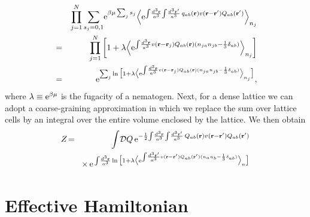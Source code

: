 \documentclass[jcp,aps,twocolumn,showpacs,supergroupedaddress,epsfig,amsmath,amssymb,eqsecnum]{revtex4}
\newcommand{\ba}{\begin{eqnarray}}
\newcommand{\ea}{\end{eqnarray}}
\newcommand{\rv}{{\bf r}}
\begin{document}
\ba
&&\prod_{j=1}^{N} 
\sum_{s_j=0,1} \! 
{\rm e}^{\beta \mu \sum_{j} s_j}
\Big\langle
{\rm e}^{\int \! \frac{d^3\rv}{a^3} \! 
\int \! \frac{d^3\rv'}{a^3} 
\, q_{ab}(\rv) v(\rv-\rv') Q_{ab}(\rv')}
\Big\rangle_{n_j}
\nonumber
\\
&=& 
\prod_{j=1}^{N} 
\left[ 
1 + \lambda \Big\langle 
{\rm e}^{\int \! \frac{d^3\rv}{a^3} v(\rv-\rv_j) Q_{ab}(\rv)(n_{ja}n_{jb}-\frac{1}{3}\delta_{ab})}
\Big\rangle_{n_j}
\right]
\nonumber\\
&=& 
{\rm e}^{\sum_j \ln 
\big[ 
1 + \lambda \big\langle 
{\rm e}^{\int \! \frac{d^3\rv}{a^3} v(\rv-\rv_j) Q_{ab}(\rv)(n_{ja}n_{jb}-\frac{1}{3}\delta_{ab})}
\big\rangle_{n_j}
\big]},
\nonumber
\ea
where $\lambda \equiv {\rm e}^{\beta\mu}$ is the fugacity of a nematogen. Next, for a dense lattice we can adopt a coarse-graining approximation in which we replace the sum over lattice cells by an integral over the entire volume enclosed by the lattice. We then obtain 
\ba
Z &\!=\!& \int\!\mathcal{D}Q \, 
{\rm e}^{-\frac{1}{2} \!\int\! \frac{d^3\rv}{a^3} \! \int \! \frac{d^3\rv'}{a^3} \, 
Q_{ab}(\rv) v(\rv - \rv') Q_{ab}(\rv')}
\\
&&\times \, 
{\rm e}^{\, \int \! \frac{d^3\rv}{a^3} \ln
\big[ 
1 + \lambda \big\langle 
{\rm e}^{\int \! \frac{d^3\rv'}{a^3} v(\rv-\rv') 
Q_{ab}(\rv')(n_{a}n_{b}-\frac{1}{3}\delta_{ab})}
\big\rangle_{n}
\big]}
\nonumber
\ea

\section{Effective Hamiltonian}
\end{document}

